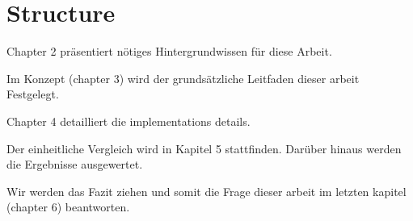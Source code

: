\documentclass[main.tex]{subfiles}
\begin{document}
\section{Structure}
Chapter 2 präsentiert nötiges Hintergrundwissen für diese Arbeit.

Im Konzept (chapter 3) wird der grundsätzliche Leitfaden dieser arbeit Festgelegt.

Chapter 4 detailliert die implementations details.

Der einheitliche Vergleich wird in Kapitel 5 stattfinden. Darüber hinaus werden die Ergebnisse ausgewertet.

Wir werden das Fazit ziehen und somit die Frage dieser arbeit im letzten kapitel (chapter 6) beantworten.
\end{document}
